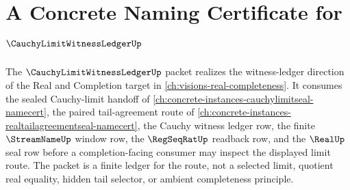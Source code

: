 \chapter{A Concrete Naming Certificate for $\CauchyLimitWitnessLedgerUp$}
\label{ch:concrete-instances-cauchy-limit-witness-ledger-namecert}

The $\CauchyLimitWitnessLedgerUp$ packet realizes the witness-ledger direction of the Real and Completion target in \autoref{ch:visions-real-completeness}. It consumes the sealed Cauchy-limit handoff of \autoref{ch:concrete-instances-cauchylimitseal-namecert}, the paired tail-agreement route of \autoref{ch:concrete-instances-realtailagreementseal-namecert}, the Cauchy witness ledger row, the finite $\StreamNameUp$ window row, the $\RegSeqRatUp$ readback row, and the $\RealUp$ seal row before a completion-facing consumer may inspect the displayed limit route. The packet is a finite ledger for the route, not a selected limit, quotient real equality, hidden tail selector, or ambient completeness principle.

